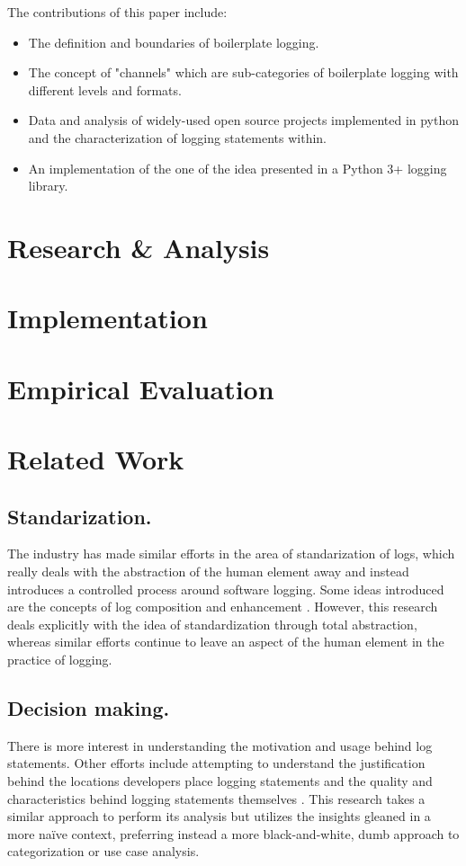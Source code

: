 \documentclass[acmsmall,review,authorversion]{acmart}
\begin{document}
    The contributions of this paper include:
    
    \begin{itemize}
        \item The definition and boundaries of boilerplate logging.
        \item The concept of "channels" which are sub-categories of boilerplate logging with different levels and formats.
        \item Data and analysis of widely-used open source projects implemented in python and the characterization of logging statements within.
        \item An implementation of the one of the idea presented in a Python 3+ logging library.
    \end{itemize}
    

\section{Research \& Analysis}

\section{Implementation}

\section{Empirical Evaluation}

\section{Related Work}

    \subsection{Standarization.} The industry has made similar efforts in the area of standarization of logs, which really deals with the abstraction of the human element away and instead introduces a controlled process around software logging. Some ideas introduced are the concepts of log composition \cite{DBLP:conf/dls/Marron18} and enhancement \cite{DBLP:journals/tocs/YuanZPZS12}. However, this research deals explicitly with the idea of standardization through total abstraction, whereas similar efforts continue to leave an aspect of the human element in the practice of logging.
                    
    \subsection{Decision making.} There is more interest in understanding the motivation and usage behind log statements. Other efforts include attempting to understand the justification behind the locations developers place logging statements \cite{DBLP:conf/icse/FuZHLDLZX14} and the quality and characteristics behind logging statements themselves \cite{DBLP:conf/icse/YuanPZ12}. This research takes a similar approach to perform its analysis but utilizes the insights gleaned in a more naïve context, preferring instead a more black-and-white, dumb approach to categorization or use case analysis.
\end{document}
